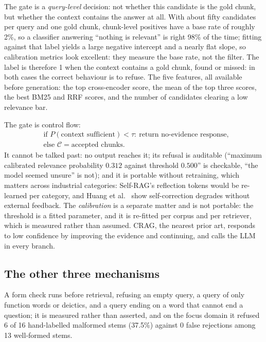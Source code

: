 \documentclass[conference]{IEEEtran}
\begin{document}
The gate is a \emph{query-level} decision: not whether this candidate is the
gold chunk, but whether the context contains the answer at all. With about
fifty candidates per query and one gold chunk, chunk-level positives have a
base rate of roughly 2\%, so a classifier answering ``nothing is relevant''
is right 98\% of the time; fitting against that label yields a large negative
intercept and a nearly flat slope, so calibration metrics look excellent:
they measure the base rate, not the filter. The label is therefore 1 when the
context contains a gold chunk, found or missed: in both cases the correct
behaviour is to refuse. The five features, all available before generation:
the top cross-encoder score, the mean of the top three scores, the best BM25
and RRF scores, and the number of candidates clearing a low relevance bar.

The gate is control flow:
\begin{equation}
\begin{aligned}
&\text{if } P(\text{context sufficient}) < \tau:\ \text{return no-evidence response},\\[-1pt]
&\text{else } \mathcal{C}=\text{accepted chunks}.
\end{aligned}
\label{eq:gate}
\end{equation}
It cannot be talked past: no output reaches it; its refusal is auditable
(``maximum calibrated relevance probability $0.312$ against threshold
$0.500$'' is checkable, ``the model seemed unsure'' is not); and it is
portable without retraining, which matters across industrial categories:
Self-RAG's reflection tokens would be re-learned per category, and Huang
et al.~\cite{huang2024selfcorrect} show self-correction degrades without
external feedback. The \emph{calibration} is a separate matter and is not
portable: the threshold is a fitted parameter, and it is re-fitted per corpus
and per retriever, which is measured rather than assumed. CRAG, the nearest prior art, responds to low confidence by
improving the evidence and continuing, and calls the LLM in every branch.

\subsection{The other three mechanisms}

A form check runs before retrieval, refusing an empty query, a query of only
function words or deictics, and a query ending on a word that cannot end a
question; it is measured rather than asserted, and on
the focus domain it refused 6 of
16 hand-labelled malformed stems
(37.5\%) against 0 false
rejections among 13 well-formed stems.
\end{document}

